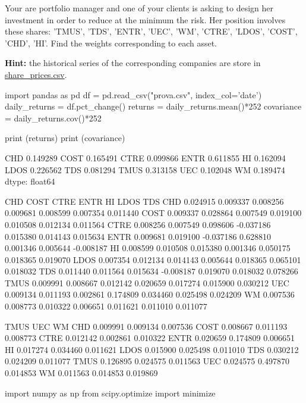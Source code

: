 \begin{question}
Your are portfolio manager and one of your clients is asking to design her investment in order to reduce at the minimum the risk. Her position involves these shares: 'TMUS', 'TDS', 'ENTR', 'UEC', 'WM', 'CTRE', 'LDOS', 'COST', 'CHD', 'HI'.
Find the weights corresponding to each asset.

\noindent\textbf{Hint:} the historical series of the corresponding companies are store in \href{https://drive.google.com/file/d/1ARryI7zpNVqlpzPsrNS2rTH9Knj07JBV/view?usp=sharing}{share\_prices.csv}.

\end{question}

\cprotEnv \begin{solution}
\begin{ipython}
import pandas as pd
df = pd.read_csv("prova.csv", index_col='date')
daily_returns = df.pct_change()
returns = daily_returns.mean()*252
covariance = daily_returns.cov()*252

print (returns)
print (covariance)
\end{ipython}
\begin{ioutput}
CHD 	0.149289
COST 	0.165491
CTRE 	0.099866
ENTR 	0.611855
HI 	    0.162094
LDOS 	0.226562
TDS 	0.081294
TMUS 	0.313158
UEC 	0.102048
WM 	    0.189474
dtype: float64

          CHD     COST      CTRE      ENTR       HI     LDOS       TDS
CHD  0.024915 0.009337  0.008256  0.009681 0.008599 0.007354  0.011440
COST 0.009337 0.028864  0.007549  0.019100 0.010508 0.012134  0.011564
CTRE 0.008256 0.007549  0.098606 -0.037186 0.015380 0.014143  0.015634
ENTR 0.009681 0.019100 -0.037186  0.628810 0.001346 0.005644 -0.008187
HI   0.008599 0.010508  0.015380  0.001346 0.050175 0.018365  0.019070
LDOS 0.007354 0.012134  0.014143  0.005644 0.018365 0.065101  0.018032
TDS  0.011440 0.011564  0.015634 -0.008187 0.019070 0.018032  0.078266
TMUS 0.009991 0.008667  0.012142  0.020659 0.017274 0.015900  0.030212
UEC  0.009134 0.011193  0.002861  0.174809 0.034460 0.025498  0.024209
WM   0.007536 0.008773  0.010322  0.006651 0.011621 0.011010  0.011077

         TMUS      UEC       WM
CHD  0.009991 0.009134 0.007536
COST 0.008667 0.011193 0.008773
CTRE 0.012142 0.002861 0.010322
ENTR 0.020659 0.174809 0.006651
HI   0.017274 0.034460 0.011621
LDOS 0.015900 0.025498 0.011010
TDS  0.030212 0.024209 0.011077
TMUS 0.126895 0.024575 0.011563
UEC  0.024575 0.497870 0.014853
WM   0.011563 0.014853 0.019869
\end{ioutput}
\begin{ipython}
import numpy as np
from scipy.optimize import minimize


\end{ipython}
\end{solution}
